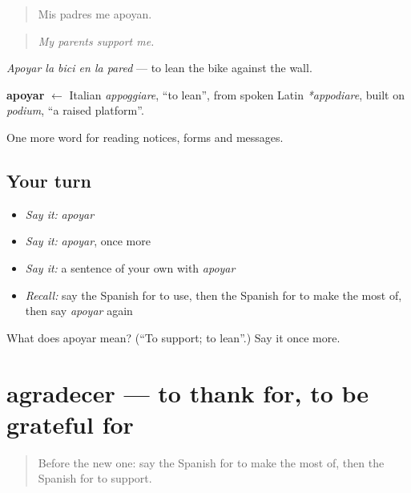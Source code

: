 \begin{quote}
Mis padres me apoyan.
\end{quote}

\begin{quote}
\emph{My parents support me.}
\end{quote}

\emph{Apoyar la bici en la pared} — to lean the bike against the wall.

\begin{cousinweb}
\textbf{apoyar} $\leftarrow$ Italian \emph{appoggiare}, \textquotedblleft{}to lean\textquotedblright{}, from spoken Latin \emph{*appodiare}, built on \emph{podium}, \textquotedblleft{}a raised platform\textquotedblright{}.
\end{cousinweb}

\begin{grammarlens}[title={What you've built}]
One more word for reading notices, forms and messages.
\end{grammarlens}

\subsection*{Your turn}
\begin{itemize}
\raggedright
  \item \emph{Say it:} \emph{apoyar}
  \item \emph{Say it:} \emph{apoyar}, once more
  \item \emph{Say it:} a sentence of your own with \emph{apoyar}
  \item \emph{Recall:} say the Spanish for to use, then the Spanish for to make the most of, then say \emph{apoyar} again
\end{itemize}

\begin{tcolorbox}[breakable,colback=teal!4,colframe=teal!35!black,title={Before you move on}]
What does apoyar mean? (\textquotedblleft{}To support; to lean\textquotedblright{}.) Say it once more.
\end{tcolorbox}
\section[agradecer]{agradecer — to thank for, to be grateful for}

\label{lesson:ES-C484-agradecer}



\begin{quote}
Before the new one: say the Spanish for to make the most of, then the Spanish for to support.
\end{quote}

